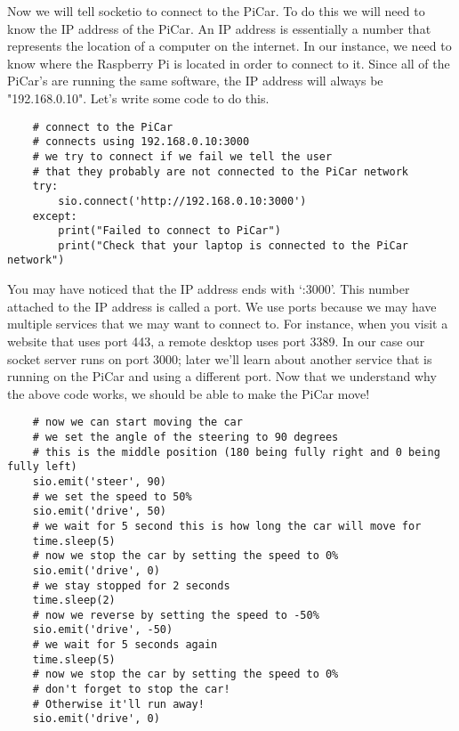 \documentclass[11pt]{report}
\begin{document}
Now we will tell socketio to connect to the PiCar. To do this we will need to know the IP address of the PiCar. An IP address is essentially a number that represents the location of a computer on the internet. In our instance, we need to know where the Raspberry Pi is located in order to connect to it. Since all of the PiCar's are running the same software, the IP address will always be "192.168.0.10". Let's write some code to do this.

\begin{verbatim}
    # connect to the PiCar
    # connects using 192.168.0.10:3000
    # we try to connect if we fail we tell the user 
    # that they probably are not connected to the PiCar network
    try:
        sio.connect('http://192.168.0.10:3000')
    except:
        print("Failed to connect to PiCar")
        print("Check that your laptop is connected to the PiCar network")
    \end{verbatim}

You may have noticed that the IP address ends with ‘:3000’. This number attached to the IP address is called a port. We use ports because we may have multiple services that we may want to connect to. For instance, when you visit a website that uses port 443, a remote desktop uses port 3389. In our case our socket server runs on port 3000; later we'll learn about another service that is running on the PiCar and using a different port. Now that we understand why the above code works, we should be able to make the PiCar move!

\begin{verbatim}
    # now we can start moving the car
    # we set the angle of the steering to 90 degrees
    # this is the middle position (180 being fully right and 0 being fully left)
    sio.emit('steer', 90)
    # we set the speed to 50%
    sio.emit('drive', 50)
    # we wait for 5 second this is how long the car will move for
    time.sleep(5)
    # now we stop the car by setting the speed to 0%
    sio.emit('drive', 0)
    # we stay stopped for 2 seconds
    time.sleep(2)
    # now we reverse by setting the speed to -50%
    sio.emit('drive', -50)
    # we wait for 5 seconds again
    time.sleep(5)
    # now we stop the car by setting the speed to 0%
    # don't forget to stop the car!
    # Otherwise it'll run away!
    sio.emit('drive', 0)
    \end{verbatim}
\end{document}
